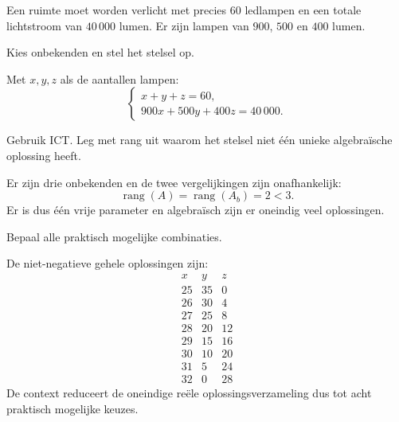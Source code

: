 \documentclass{ximera}
\begin{document}


\begin{oefening}{\oefU\ESS}

Een ruimte moet worden verlicht met precies \(60\) ledlampen en een totale
lichtstroom van \(40\,000\) lumen. Er zijn lampen van \(900\), \(500\) en
\(400\) lumen.

\begin{question}
Kies onbekenden en stel het stelsel op.
\begin{oplossing}
Met \(x,y,z\) als de aantallen lampen:
\[
\begin{cases}
x+y+z=60,\\
900x+500y+400z=40\,000.
\end{cases}
\]
\end{oplossing}
\end{question}

\begin{question}
Gebruik ICT. Leg met rang uit waarom het stelsel niet één unieke
algebraïsche oplossing heeft.
\begin{oplossing}
Er zijn drie onbekenden en de twee vergelijkingen zijn onafhankelijk:
\[
\operatorname{rang}(A)=\operatorname{rang}(A_b)=2<3.
\]
Er is dus één vrije parameter en algebraïsch zijn er oneindig veel oplossingen.
\end{oplossing}
\end{question}

\begin{question}
Bepaal alle praktisch mogelijke combinaties.
\begin{oplossing}
De niet-negatieve gehele oplossingen zijn:
\[
\begin{array}{c|c|c}
x&y&z\\ \hline
25&35&0\\
26&30&4\\
27&25&8\\
28&20&12\\
29&15&16\\
30&10&20\\
31&5&24\\
32&0&28
\end{array}
\]
De context reduceert de oneindige reële oplossingsverzameling dus tot acht
praktisch mogelijke keuzes.
\end{oplossing}
\end{question}
\end{oefening}
\end{document}
